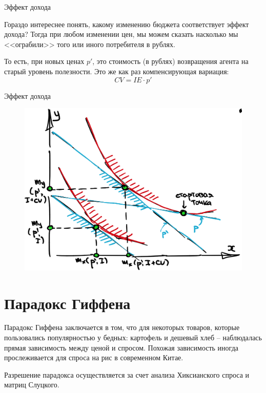 \documentclass{beamer}
\begin{document}
\begin{frame}{Эффект дохода}

Гораздо интереснее понять, какому изменению бюджета соответствует эффект дохода? Тогда при любом изменении цен, мы можем сказать насколько мы <<ограбили>> того или иного потребителя в рублях.

 То есть, при новых ценах $p'$, это стоимость (в рублях) возвращения агента на старый уровень полезности. Это же как раз компенсирующая вариация:
$$ CV = IE \cdot p' $$

\end{frame}

\begin{frame}{Эффект дохода}

\begin{figure}[hbt]
\centering
\includegraphics[width=.8 \textwidth]{IE.png}
\end{figure}

\end{frame}

\section{Парадокс Гиффена}

\begin{frame}

Парадокс Гиффена заключается в том, что для некоторых товаров, которые пользовались популярностью у бедных: картофель и дешевый хлеб – наблюдалась прямая зависимость между ценой и спросом. Похожая зависимость иногда прослеживается для спроса на рис в современном Китае.

Разрешение парадокса осуществляется за счет анализа Хиксианского спроса и матриц Слуцкого. 

\end{frame}
\end{document}

